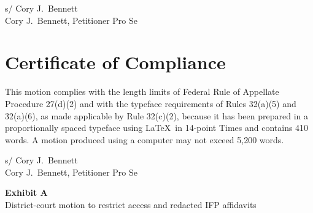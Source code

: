 \documentclass[14pt]{extarticle}
\newcommand{\IfpWordCount}{410}
\newcommand{\IfpExhibitAPdf}{Civil/Filing/motion-restrict-ifp-affidavit.pdf}%
\newcommand{\IfpExhibitAPdf}{../Filing/motion-restrict-ifp-affidavit.pdf}%
\begin{document}
\vspace{0.8em}
\noindent s/ Cory J.\ Bennett\\
Cory J.\ Bennett, Petitioner Pro Se

\vspace{1.2em}
\section*{Certificate of Compliance}

This motion complies with the length limits of Federal Rule of Appellate Procedure 27(d)(2) and with the typeface requirements of Rules 32(a)(5) and 32(a)(6), as made applicable by Rule 32(c)(2), because it has been prepared in a proportionally spaced typeface using \LaTeX\ in 14-point Times and contains \IfpWordCount{} words. A motion produced using a computer may not exceed 5,200 words.

\vspace{0.8em}
\noindent s/ Cory J.\ Bennett\\
Cory J.\ Bennett, Petitioner Pro Se

\clearpage
\thispagestyle{empty}
\vspace*{2.2in}
\begin{center}
{\LARGE\bfseries Exhibit A}\\[0.7em]
{\large District-court motion to restrict access and redacted IFP affidavits}
\end{center}

\end{document}

